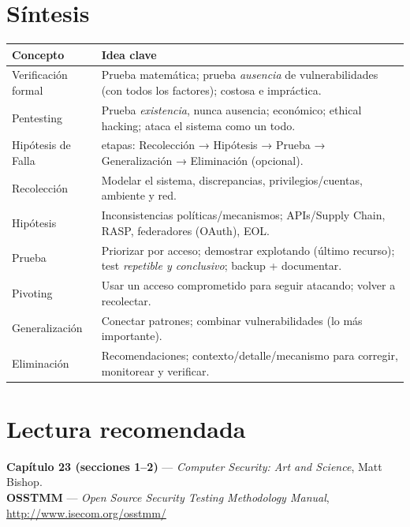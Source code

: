 \documentclass[11pt,a4paper]{article}
\begin{document}
\section{Síntesis}

\begin{center}
\renewcommand{\arraystretch}{1.25}
\begin{tabular}{>{\raggedright\arraybackslash}p{3.4cm} >{\raggedright\arraybackslash}p{10.6cm}}
\toprule
\textbf{Concepto} & \textbf{Idea clave} \\
\midrule
Verificación formal & Prueba matemática; prueba \emph{ausencia} de vulnerabilidades (con todos los factores); costosa e impráctica. \\
Pentesting & Prueba \emph{existencia}, nunca ausencia; económico; ethical hacking; ataca el sistema como un todo. \\
Hipótesis de Falla & 5 etapas: Recolección → Hipótesis → Prueba → Generalización → Eliminación (opcional). \\
Recolección & Modelar el sistema, discrepancias, privilegios/cuentas, ambiente y red. \\
Hipótesis & Inconsistencias políticas/mecanismos; APIs/Supply Chain, RASP, federadores (OAuth), EOL. \\
Prueba & Priorizar por acceso; demostrar explotando (último recurso); test \emph{repetible y conclusivo}; backup + documentar. \\
Pivoting & Usar un acceso comprometido para seguir atacando; volver a recolectar. \\
Generalización & Conectar patrones; combinar vulnerabilidades (lo más importante). \\
Eliminación & Recomendaciones; contexto/detalle/mecanismo para corregir, monitorear y verificar. \\
\bottomrule
\end{tabular}
\end{center}

\section*{Lectura recomendada}
\begin{slidebox}
\centering
\textbf{Capítulo 23 (secciones 1--2)} --- \emph{Computer Security: Art and Science},
Matt Bishop.\\[4pt]
\textbf{OSSTMM} --- \emph{Open Source Security Testing Methodology Manual},
\url{http://www.isecom.org/osstmm/}
\end{slidebox}
\end{document}
